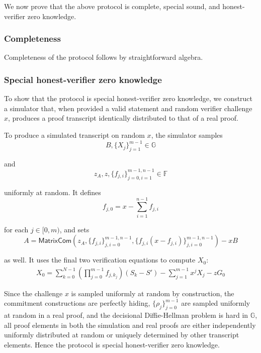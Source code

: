 \begin{appendices}
We now prove that the above protocol is complete, special sound, and honest-verifier zero knowledge.

\subsubsection{Completeness}
\label{appendix:grootle-proof-security-completeness}

Completeness of the protocol follows by straightforward algebra.

\subsubsection{Special honest-verifier zero knowledge}
\label{appendix:grootle-proof-security-special-zk}

To show that the protocol is special honest-verifier zero knowledge, we construct a simulator that, when provided a valid statement and random verifier challenge $x$, produces a proof transcript identically distributed to that of a real proof.

To produce a simulated transcript on random $x$, the simulator samples\vspace{.115cm}
\[ B, \{X_j\}^{m-1}_{j=1} \in \mathbb{G} \]

and
\[ z_A, z, \{f_{j,i}\}^{m-1,n-1}_{j=0,i=1} \in \mathbb{F} \]

uniformly at random. It defines\vspace{.115cm}
\[ f_{j,0} = x - \sum^{n-1}_{i=1} f_{j,i} \]

for each $j \in [0,m)$, and sets\vspace{.115cm}
\[ A = \mathsf{MatrixCom} \left( z_A, \{f_{j,i}\}^{m-1,n-1}_{j,i=0}, \{f_{j,i}(x-f_{j,i})\}^{m-1,n-1}_{j,i=0} \right) - x B \]

as well. It uses the final two verification equations to compute $X_0$:\vspace{.115cm}
\begin{align*}
    X_0  = \sum^{N-1}_{k=0} \left( \prod^{m-1}_{j=0} f_{j,k_j} \right) (S_k - S') - \sum^{m-1}_{j=1} x^j X_j - z G_0
\end{align*}

Since the challenge $x$ is sampled uniformly at random by construction, the commitment constructions are perfectly hiding, $\{\rho_j\}^{m-1}_{j=0}$ are sampled uniformly at random in a real proof, and the decisional Diffie-Hellman problem is hard in $\mathbb{G}$, all proof elements in both the simulation and real proofs are either independently uniformly distributed at random or uniquely determined by other transcript elements. Hence the protocol is special honest-verifier zero knowledge.


\end{appendices}
